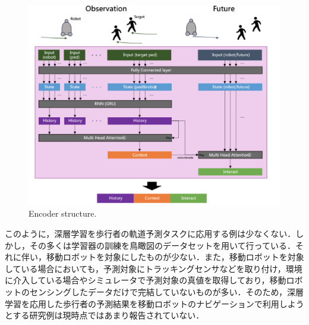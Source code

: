 
\begin{figure}[hbtp]
     \centering
    \includegraphics[keepaspectratio, scale=0.70]
         {images/future-robot.png}
    \caption{Encoder structure.\protect\footnotemark[5]}
    \label{Fig:future-robot}
\end{figure}

\protect{}

このように，深層学習を歩行者の軌道予測タスクに応用する例は少なくない．しかし，その多くは学習器の訓練を鳥瞰図のデータセットを用いて行っている．それに伴い，移動ロボットを対象にしたものが少ない．また，移動ロボットを対象している場合においても，予測対象にトラッキングセンサなどを取り付け，環境に介入している場合やシミュレータで予測対象の真値を取得しており，移動ロボットのセンシングしたデータだけで完結していないものが多い．そのため，深層学習を応用した歩行者の予測結果を移動ロボットのナビゲーションで利用しようとする研究例は現時点ではあまり報告されていない．

\newpage